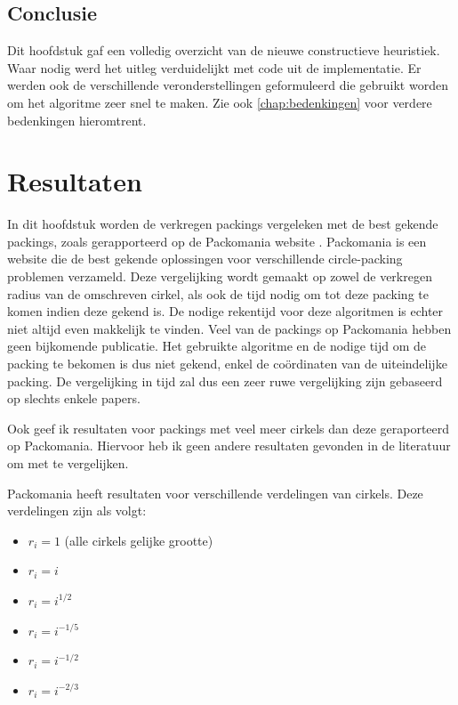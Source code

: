 \documentclass[12pt,a4paper,oneside]{book}
\begin{document}
\section{Conclusie}

Dit hoofdstuk gaf een volledig overzicht van de nieuwe constructieve heuristiek.
Waar nodig werd het uitleg verduidelijkt met code uit de implementatie.
Er werden ook de verschillende veronderstellingen geformuleerd die gebruikt worden om het algoritme zeer snel te maken.
Zie ook \autoref{chap:bedenkingen} voor verdere bedenkingen hieromtrent.

\chapter{Resultaten} \label{chap:resultaten}

In dit hoofdstuk worden de verkregen packings vergeleken met de best gekende packings, zoals gerapporteerd op de Packomania website \cite{packomania}.
Packomania is een website die de best gekende oplossingen voor verschillende circle-packing problemen verzameld.
Deze vergelijking wordt gemaakt op zowel de verkregen radius van de omschreven cirkel, als ook de tijd nodig om tot deze packing te komen indien deze gekend is.
De nodige rekentijd voor deze algoritmen is echter niet altijd even makkelijk te vinden.
Veel van de packings op Packomania hebben geen bijkomende publicatie.
Het gebruikte algoritme en de nodige tijd om de packing te bekomen is dus niet gekend, enkel de coördinaten van de uiteindelijke packing.
De vergelijking in tijd zal dus een zeer ruwe vergelijking zijn gebaseerd op slechts enkele papers.

Ook geef ik resultaten voor packings met veel meer cirkels dan deze geraporteerd op Packomania.
Hiervoor heb ik geen andere resultaten gevonden in de literatuur om met te vergelijken.

Packomania heeft resultaten voor verschillende verdelingen van cirkels.
Deze verdelingen zijn als volgt:

\begin{itemize}
	\item $r_i=1$ (alle cirkels gelijke grootte)
	\item $r_i=i$
	\item $r_i=i^{1/2}$
	\item $r_i=i^{-1/5}$
	\item $r_i=i^{-1/2}$
	\item $r_i=i^{-2/3}$
\end{itemize}
\end{document}

